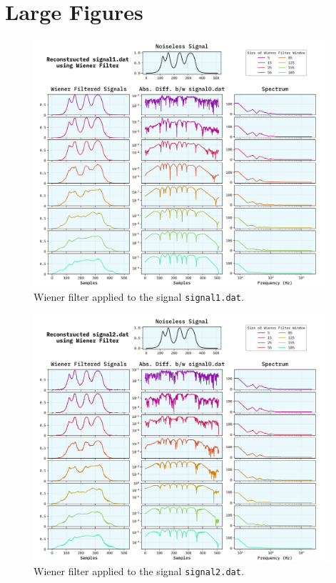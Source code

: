 \documentclass[10pt, titlepage, a4paper]{article}
\begin{document}

\newpage
\section{Large Figures}

\begin{figure}[H]
    \centering
    \includegraphics[width=0.98\textwidth]{../WienerFilter/Images/reconstructed-signal1.dat.png}
    \caption{Wiener filter applied to the signal \texttt{signal1.dat}.}
    \label{fig:wiener-filter-1}
\end{figure}

\begin{figure}[H]
    \centering
    \includegraphics[width=0.98\textwidth]{../WienerFilter/Images/reconstructed-signal2.dat.png}
    \caption{Wiener filter applied to the signal \texttt{signal2.dat}.}
    \label{fig:wiener-filter-2}
\end{figure}
\end{document}
